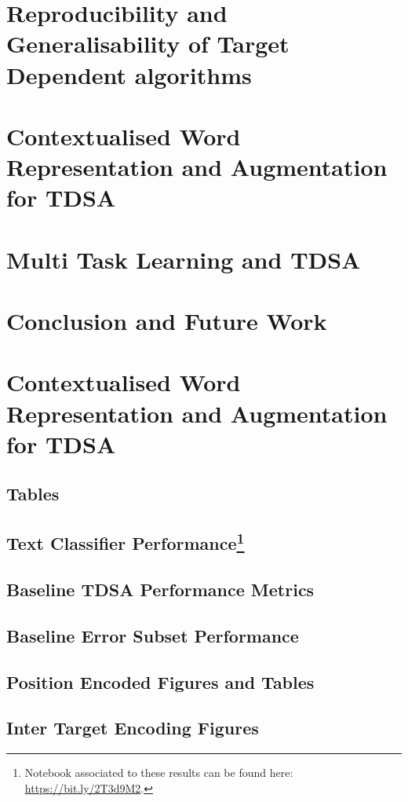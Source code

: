 \documentclass[11pt]{report}
\begin{document}
\chapter{Reproducibility and Generalisability of Target Dependent algorithms}
\label{chapter:reproducibility}

\chapter{Contextualised Word Representation and Augmentation for TDSA}

\chapter{Multi Task Learning and TDSA}
\chapter{Conclusion and Future Work}
\appendix
\chapter{Contextualised Word Representation and Augmentation for TDSA}
\section{Tables}

\section{Text Classifier Performance\footnote{Notebook associated to these results can be found here: \url{https://bit.ly/2T3d9M2}.}}
\label{section:appendix_cnn_tdsa_baseline}

\section{Baseline TDSA Performance Metrics}
\label{section:appendix_tdsa_baseline_metrics}

\section{Baseline Error Subset Performance}
\label{section:appendix_baseline_error_subset_performance}

\section{Position Encoded Figures and Tables}
\label{section:appendix_position_encoded_figures_and_tables}

\section{Inter Target Encoding Figures}
\label{section:appendix_inter_target_encoding_figures_and_tables}




\printbibliography
\end{document}

